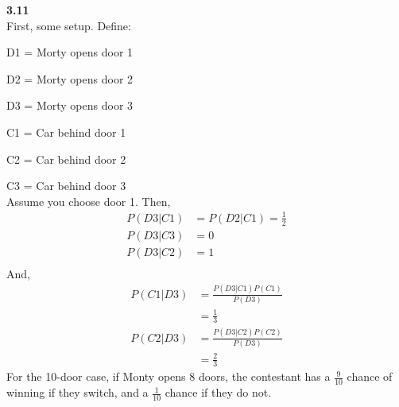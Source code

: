 \documentclass[letterpaper,12pt]{article}
\theoremstyle{definition}
\begin{document}
\noindent\textbf{3.11}\\
\noindent First, some setup. Define:\par
	D1 = Morty opens door 1\par
	D2 = Morty opens door 2\par
	D3 = Morty opens door 3\par
	C1 = Car behind door 1\par
	C2 = Car behind door 2\par
	C3 = Car behind door 3\newline\\
\noindent Assume you choose door 1. Then,
\begin{align*}
P(D3 | C1) &= P(D2 | C1) = \frac{1}{2}\\
P(D3 | C3) &= 0\\
P(D3 | C2) &= 1\\
\end{align*}
And,
\begin{equation*}
\begin{split}
P(C1 | D3) &= \frac{P(D3 | C1)P(C1)}{P(D3)}\\
&= \frac{1}{3}\\
P(C2 | D3) &= \frac{P(D3 | C2)P(C2)}{P(D3)}\\
&= \frac{2}{3}
\end{split}
\end{equation*}
For the 10-door case, if Monty opens 8 doors, the contestant has a $\frac{9}{10}$ chance of winning if they switch, and a $\frac{1}{10}$ chance if they do not.
\end{document}
